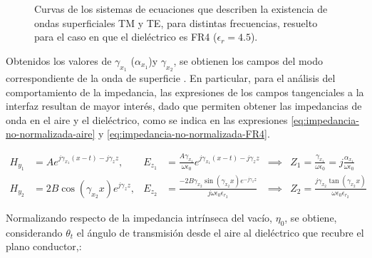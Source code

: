 \begin{figure} [H]
	\centering 
	\caption{Curvas de los sistemas de ecuaciones que describen la existencia de ondas superficiales TM y TE, para distintas frecuencias, resuelto para el caso en que el dieléctrico es FR4 ($\epsilon_r = 4.5$).}
	\label{fig:intersecciones-tm-te}
\end{figure}

Obtenidos los valores de $\gamma_{x_1}$ ($\alpha_{x_1}$)y $\gamma_{x_2}$, se obtienen los campos del modo correspondiente de la onda de superficie \cite{Pozar:MwEngineering}. En particular, para el análisis del comportamiento de la impedancia, las expresiones de los campos tangenciales a la interfaz resultan de mayor interés, dado que permiten obtener las impedancias de onda en el aire y el dieléctrico, como se indica en las expresiones \ref{eq:impedancia-no-normalizada-aire} y \ref{eq:impedancia-no-normalizada-FR4}.

\begin{subequations}
	\begin{align}
		H_{y_1} &= A e^{j\gamma_{x_1}(x-t)-j\gamma_{z} z}, &E_{z_1} &= \frac{A \gamma_{x_1}}{\omega \epsilon_0} e^{j\gamma_{x_1}(x-t)-j\gamma_{z} z} &\implies& Z_1 = \frac{\gamma_{x_1}}{\omega \epsilon_0} = j\frac{\alpha_{x_1}}{\omega \epsilon_0} \label{eq:impedancia-no-normalizada-aire}\\
		H_{y_2} &= 2 B \cos(\gamma_{x_2} x) e^{j\gamma_{z} z}, &E_{z_2} &=  \frac{-2 B \gamma_{x_2} \sin(\gamma_{x_2} x)e^{-j\gamma_{z} z}}{j \omega \epsilon_0 \epsilon_{r_2}} &\implies& Z_2 = \frac{j\gamma_{x_2} \tan(\gamma_{x_2} x)}{\omega \epsilon_0 \epsilon_{r_2}} \label{eq:impedancia-no-normalizada-FR4}
	\end{align}
\end{subequations}

Normalizando respecto de la impedancia intrínseca del vacío, $\eta_0$, se obtiene, considerando $\theta_t$ el ángulo de transmisión desde el aire al dieléctrico que recubre el plano conductor,:

